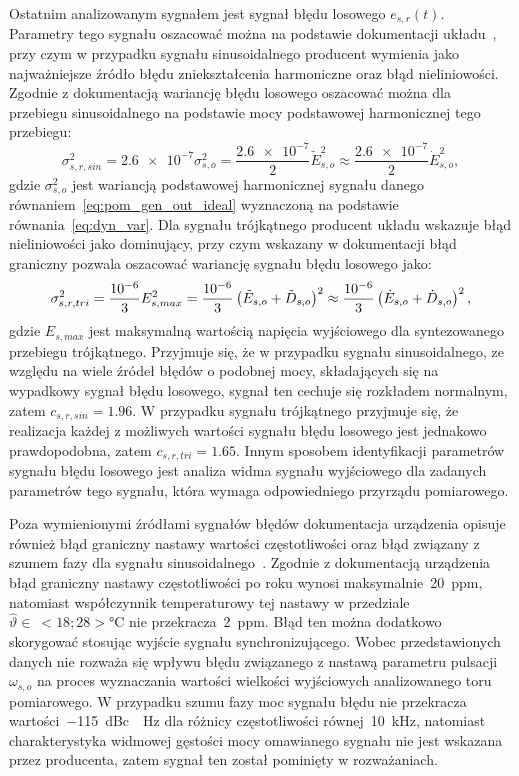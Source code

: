 Ostatnim analizowanym sygnałem jest sygnał błędu losowego $e_{s,r}(t)$. Parametry tego sygnału oszacować można na podstawie dokumentacji układu~\cite{rigol_fawg}, przy czym w przypadku sygnału sinusoidalnego producent wymienia jako najważniejsze źródło błędu zniekształcenia harmoniczne oraz błąd nieliniowości. Zgodnie z dokumentacją wariancję błędu losowego oszacować można dla przebiegu sinusoidalnego na podstawie mocy podstawowej harmonicznej tego przebiegu:
\begin{equation}
\sigma_{s,r,sin}^{2} = \num{2.6e-7} \sigma_{s,o}^{2} = \frac{\num{2.6e-7}}{2} \tilde{E}_{s,o}^{2} \approx \frac{\num{2.6e-7}}{2} \dot{E}_{s,o}^{2} \label{eq:pom_gen_var_rand_sin},
\end{equation}
gdzie $\sigma_{s,o}^{2}$ jest wariancją podstawowej harmonicznej sygnału danego równaniem~\eqref{eq:pom_gen_out_ideal} wyznaczoną na podstawie równania~\eqref{eq:dyn_var}. Dla sygnału trójkątnego producent układu wskazuje błąd nieliniowości jako dominujący, przy czym wskazany w dokumentacji błąd graniczny pozwala oszacować wariancję sygnału błędu losowego jako:
\begin{equation}
\sigma_{s,r,tri}^{2} = \frac{\num{e-6}}{3} E_{s,max}^{2} = \frac{\num{e-6}}{3} \left(\tilde{E}_{s,o} + \tilde{D}_{s,o}\right)^{2} \approx \frac{\num{e-6}}{3} \left(\dot{E}_{s,o} + \dot{D}_{s,o}\right)^{2} \label{eq:pom_gen_var_rand_saw},
\end{equation}
gdzie $E_{s,max}$ jest maksymalną wartością napięcia wyjściowego dla syntezowanego przebiegu trójkątnego. Przyjmuje się, że w przypadku sygnału sinusoidalnego, ze względu na wiele źródeł błędów o podobnej mocy, składających się na wypadkowy sygnał błędu losowego, sygnał ten cechuje się rozkładem normalnym, zatem $c_{s,r,sin} = \num{1.96}$. W przypadku sygnału trójkątnego przyjmuje się, że realizacja każdej z możliwych wartości sygnału błędu losowego jest jednakowo prawdopodobna, zatem $c_{s,r,tri} = \num{1.65}$. Innym sposobem identyfikacji parametrów sygnału błędu losowego jest analiza widma sygnału wyjściowego dla zadanych parametrów tego sygnału, która wymaga odpowiedniego przyrządu pomiarowego.

Poza wymienionymi źródłami sygnałów błędów dokumentacja urządzenia opisuje również błąd graniczny nastawy wartości częstotliwości oraz błąd związany z szumem fazy dla sygnału sinusoidalnego~\cite{rigol_fawg}. Zgodnie z dokumentacją urządzenia błąd graniczny nastawy częstotliwości po roku wynosi maksymalnie~\qty{20}{ppm}, natomiast współczynnik temperaturowy tej nastawy w przedziale $\hat{\vartheta} \in~<18;28>\unit{\degreeCelsius}$ nie przekracza~\qty{2}{ppm}. Błąd ten można dodatkowo skorygować stosując wyjście sygnału synchronizującego. Wobec przedstawionych danych nie rozważa się wpływu błędu związanego z nastawą parametru pulsacji $\omega_{s,o}$ na proces wyznaczania wartości wielkości wyjściowych analizowanego toru pomiarowego. W przypadku szumu fazy moc sygnału błędu nie przekracza wartości~\qty{-115}{dBc \per Hz} dla różnicy częstotliwości równej~\qty{10}{kHz}, natomiast charakterystyka widmowej gęstości mocy omawianego sygnału nie jest wskazana przez producenta, zatem sygnał ten został pominięty w rozważaniach.


